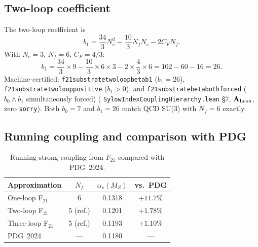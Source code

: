 \documentclass[11pt]{article}
\theoremstyle{remark}
\newcommand{\Ftwentyone}{F_{21}}
\newcommand{\lean}[1]{%
  \penalty-100
  \begingroup\def\_{\textunderscore\allowbreak}\texttt{#1}\endgroup}
\newcommand{\CatAL}{\ensuremath{\textbf{A}_{\rm Lean}}}
\begin{document}
\subsection{Two-loop coefficient}
\label{ssec:twoloop}

The two-loop coefficient is
\begin{equation}
  b_1 = \frac{34}{3} N_c^2 - \frac{10}{3} N_f N_c - 2 C_F N_f.
  \label{eq:b1formula}
\end{equation}
With $N_c = 3$, $N_f = 6$, $C_F = 4/3$:
\begin{equation}
  b_1 = \frac{34}{3} \times 9 - \frac{10}{3} \times 6 \times 3 - 2 \times \frac{4}{3} \times 6
      = 102 - 60 - 16 = 26.
  \label{eq:b1}
\end{equation}
Machine-certified: \lean{f21\_substrate\_two\_loop\_beta\_b1} ($b_1 = 26$),
\lean{f21\_substrate\_two\_loop\_positive} ($b_1 > 0$),
and \lean{f21\_substrate\_beta\_both\_forced} ($b_0 \wedge b_1$ simultaneously forced)
(\lean{SylowIndexCouplingHierarchy.lean} §7, \CatAL{}, zero \texttt{sorry}).
Both $b_0 = 7$ and $b_1 = 26$ match QCD SU(3) with $N_f = 6$ exactly.

\subsection{Running coupling and comparison with PDG}
\label{ssec:running}

\begin{table}[ht]
\centering
\caption{Running strong coupling from $\Ftwentyone$ compared with PDG~2024.}
\label{tab:alphas}
\begin{tabular}{lccc}
\toprule
Approximation & $N_f$ & $\alpha_s(M_Z)$ & vs.\ PDG \\
\midrule
One-loop F$_{21}$ & 6 & 0.1318 & $+11.7\%$ \\
Two-loop F$_{21}$ & 5 (ref.) & 0.1201 & $+1.78\%$ \\
Three-loop F$_{21}$ & 5 (ref.) & 0.1193 & $+1.10\%$ \\
PDG~2024 & --- & 0.1180 & --- \\
\bottomrule
\end{tabular}
\end{table}
\end{document}
